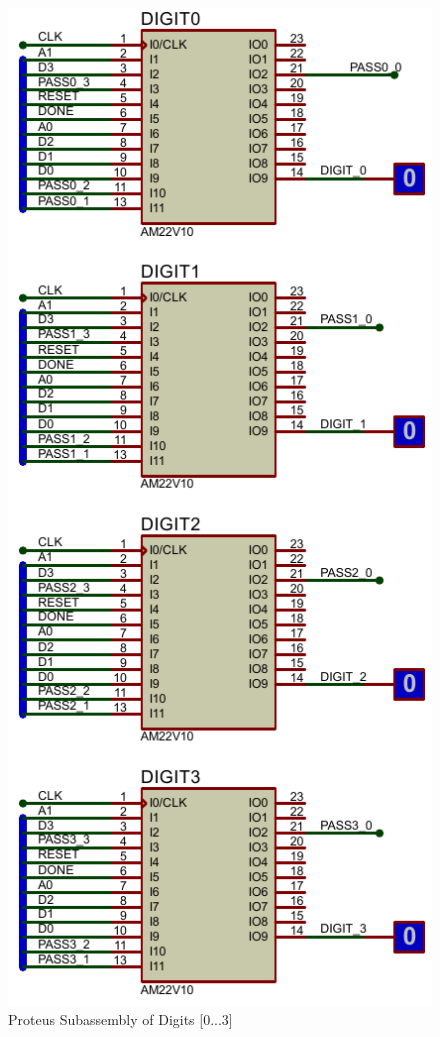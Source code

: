 \begin{figure}[H]
    \centering
    \includegraphics[scale = 1]{Graphics/DIGITS/DIGITS_PROTEUS.PDF}
    \caption{Proteus Subassembly of Digits [0...3]}
    \label{fig:DIGITS_PROTEUS}
\end{figure}


